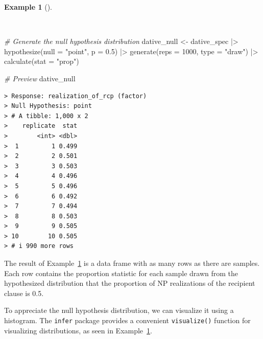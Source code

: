 \documentclass[
  letterpaper,
]{latex/krantz}
\newenvironment{Shaded}{\begin{snugshade}}{\end{snugshade}}
\newcommand{\AttributeTok}[1]{\textcolor[rgb]{0.00,0.00,0.00}{#1}}
\newcommand{\CommentTok}[1]{\textcolor[rgb]{0.00,0.00,0.00}{\textit{#1}}}
\newcommand{\DecValTok}[1]{\textcolor[rgb]{0.00,0.00,0.00}{#1}}
\newcommand{\FloatTok}[1]{\textcolor[rgb]{0.00,0.00,0.00}{#1}}
\newcommand{\FunctionTok}[1]{\textcolor[rgb]{0.00,0.00,0.00}{#1}}
\newcommand{\NormalTok}[1]{\textcolor[rgb]{0.00,0.00,0.00}{#1}}
\newcommand{\OtherTok}[1]{\textcolor[rgb]{0.00,0.00,0.00}{#1}}
\newcommand{\SpecialCharTok}[1]{\textcolor[rgb]{0.00,0.00,0.00}{#1}}
\newcommand{\StringTok}[1]{\textcolor[rgb]{0.00,0.00,0.00}{#1}}
\theoremstyle{definition}
\newtheorem{example}{Example}[chapter]
\theoremstyle{remark}
\begin{document}
\begin{example}[]\protect\hypertarget{exm-ida-cat-null-hypothesis}{}\label{exm-ida-cat-null-hypothesis}

~

\begin{Shaded}
\begin{Highlighting}[]
\CommentTok{\# Generate the null hypothesis distribution}
\NormalTok{dative\_null }\OtherTok{\textless{}{-}}
\NormalTok{  dative\_spec }\SpecialCharTok{|\textgreater{}}
  \FunctionTok{hypothesize}\NormalTok{(}\AttributeTok{null =} \StringTok{"point"}\NormalTok{, }\AttributeTok{p =} \FloatTok{0.5}\NormalTok{) }\SpecialCharTok{|\textgreater{}}
  \FunctionTok{generate}\NormalTok{(}\AttributeTok{reps =} \DecValTok{1000}\NormalTok{, }\AttributeTok{type =} \StringTok{"draw"}\NormalTok{) }\SpecialCharTok{|\textgreater{}}
  \FunctionTok{calculate}\NormalTok{(}\AttributeTok{stat =} \StringTok{"prop"}\NormalTok{)}

\CommentTok{\# Preview}
\NormalTok{dative\_null}
\end{Highlighting}
\end{Shaded}

\begin{verbatim}
> Response: realization_of_rcp (factor)
> Null Hypothesis: point
> # A tibble: 1,000 x 2
>    replicate  stat
>        <int> <dbl>
>  1         1 0.499
>  2         2 0.501
>  3         3 0.503
>  4         4 0.496
>  5         5 0.496
>  6         6 0.492
>  7         7 0.494
>  8         8 0.503
>  9         9 0.505
> 10        10 0.505
> # i 990 more rows
\end{verbatim}

\end{example}

The result of Example~\ref{exm-ida-cat-null-hypothesis} is a data frame
with as many rows as there are samples. Each row contains the proportion
statistic for each sample drawn from the hypothesized distribution that
the proportion of NP realizations of the recipient clause is 0.5.

To appreciate the null hypothesis distribution, we can visualize it
using a histogram. The \texttt{infer} package provides a convenient
\texttt{visualize()} function for visualizing distributions, as seen in
Example~\ref{exm-ida-cat-null-hypothesis}.
\end{document}
